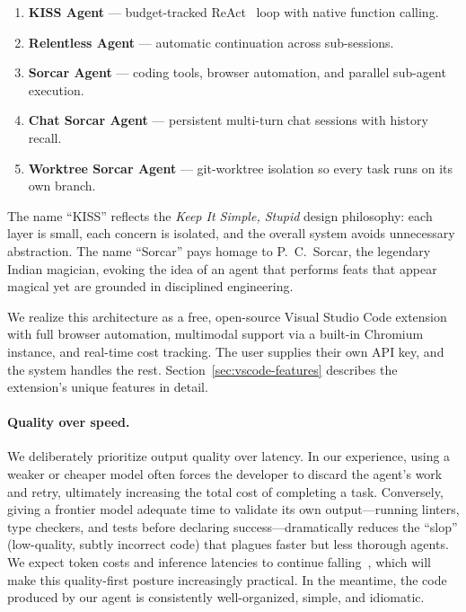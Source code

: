 \documentclass{article}
\begin{document}
\begin{enumerate}[nosep]
  \item \textbf{KISS Agent} --- budget-tracked
    ReAct~\citep{yao2023react} loop with native function calling.
  \item \textbf{Relentless Agent} --- automatic continuation across
    sub-sessions.
  \item \textbf{Sorcar Agent} --- coding tools, browser automation,
    and parallel sub-agent execution.
  \item \textbf{Chat Sorcar Agent} --- persistent multi-turn chat
    sessions with history recall.
  \item \textbf{Worktree Sorcar Agent} --- git-worktree isolation so
    every task runs on its own branch.
\end{enumerate}

The name ``KISS'' reflects the \emph{Keep It Simple, Stupid} design
philosophy: each layer is small, each concern is isolated, and the
overall system avoids unnecessary abstraction.  The name ``Sorcar''
pays homage to P.~C.~Sorcar, the legendary Indian magician, evoking
the idea of an agent that performs feats that appear magical yet are
grounded in disciplined engineering.

We realize this architecture as a free, open-source Visual Studio Code
extension with full browser automation, multimodal support via a
built-in Chromium instance, and real-time cost tracking.  The user
supplies their own API key, and the system handles the rest.
Section~\ref{sec:vscode-features} describes the extension's unique
features in detail.

\paragraph{Quality over speed.}
We deliberately prioritize output quality over latency.  In our
experience, using a weaker or cheaper model often forces the developer
to discard the agent's work and retry, ultimately increasing the total
cost of completing a task.  Conversely, giving a frontier model
adequate time to validate its own output---running linters, type
checkers, and tests before declaring success---dramatically reduces
the ``slop'' (low-quality, subtly incorrect code) that plagues
faster but less thorough agents.  We expect token costs and inference
latencies to continue falling~\citep{gao2025trae}, which will make
this quality-first posture increasingly practical.  In the meantime,
the code produced by our agent is consistently well-organized, simple,
and idiomatic.
\end{document}
